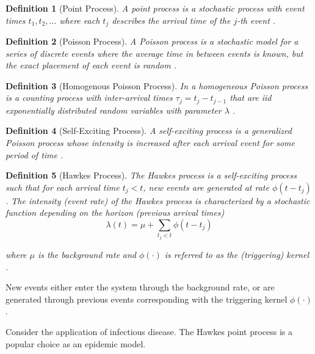 \documentclass[12pt]{article}
\newtheorem{definition}{Definition}
\begin{document}
\begin{definition}[Point Process]
A point process is a stochastic process with event times $t_1, t_2, \ldots$ where each $t_j$ describes the arrival time of the $j$-th event \cite{Rizoiu2018}.
\end{definition}
\vspace{3mm}

\begin{definition}[Poisson Process]
A Poisson process is a stochastic model for a series of discrete events where the average time in between events is known, but the exact placement of each event is random \cite{Rizoiu2018}. 
\end{definition}
\vspace{3mm}

\begin{definition}[Homogenous Poisson Process]
In a homogeneous Poisson process is a counting process with inter-arrival times $\tau_j = t_j - t_{j-1}$ that are iid exponentially distributed random variables with parameter $\lambda$ \cite{Rizoiu2018}. 
\end{definition}
\vspace{3mm}

\begin{definition}[Self-Exciting Process] 
A self-exciting process is a generalized Poisson process whose intensity is increased after each arrival event for some period of time \cite{Dahlqvist2022}.
\end{definition}
\vspace{3mm}

\begin{definition}[Hawkes Process]
The Hawkes process is a self-exciting process such that for each arrival time $t_j < t$, new events are generated at rate $\phi(t - t_j)$. The intensity (event rate) of the Hawkes process is characterized by a stochastic function depending on the horizon (previous arrival times)
$$
\lambda(t) = \mu + \sum_{t_j < t} \phi(t - t_j)
$$

where $\mu$ is the background rate and $\phi(\cdot)$ is referred to as the (triggering) kernel \cite{Rizoiu2018, Reinhart2018}.
\end{definition}
\vspace{3mm}
New events either enter the system through the background rate, or are generated through previous events corresponding with the triggering kernel $\phi(\cdot)$. 


Consider the application of infectious disease. The Hawkes point process is a popular choice as an epidemic model. 
\vspace{3mm}
\end{document}
